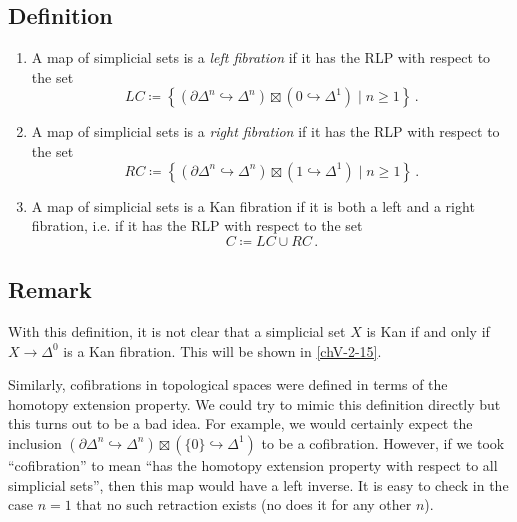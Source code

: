     \subsection{Definition}
        \begin{enumerate}[label=\roman*)]
            \item 
                A map of simplicial sets is a \emph{left fibration} if it has the RLP with respect to the set
                \begin{equation*}
                    LC \coloneq \left\{ (\partial \Delta^n \hookrightarrow \Delta^n) \boxtimes ({0} \hookrightarrow \Delta^1) \mid n \geq 1 \right\} \,.
                \end{equation*}
            \item 
                A map of simplicial sets is a \emph{right fibration} if it has the RLP with respect to the set
                \begin{equation*}
                    RC \coloneq \left\{ (\partial \Delta^n \hookrightarrow \Delta^n) \boxtimes ({1} \hookrightarrow \Delta^1) \mid n \geq 1 \right\} \,.
                \end{equation*}
            \item 
                A map of simplicial sets is a Kan fibration if it is both a left and a right fibration, i.e. if it has the RLP with respect to the set
                \begin{equation*}
                    C \coloneq LC \cup RC \,.
                \end{equation*}
        \end{enumerate}    

    \subsection{Remark}
        With this definition, it is not clear that a simplicial set $X$ is Kan if and only if $X \to \Delta^0$ is a Kan fibration. This will be shown in \ref{chV-2-15}.
        \smallskip

        Similarly, cofibrations in topological spaces were defined in terms of the homotopy extension property. We could try to mimic this definition directly but this turns out to be a bad idea. For example, we would certainly expect the inclusion $(\partial \Delta^n \hookrightarrow \Delta^n) \boxtimes (\{0\} \hookrightarrow \Delta^1)$ to be a cofibration. However, if we took ``cofibration'' to mean ``has the homotopy extension property with respect to all simplicial sets'', then this map would have a left inverse. It is easy to check in the case $n = 1$ that no such retraction exists (no does it for any other $n$).

